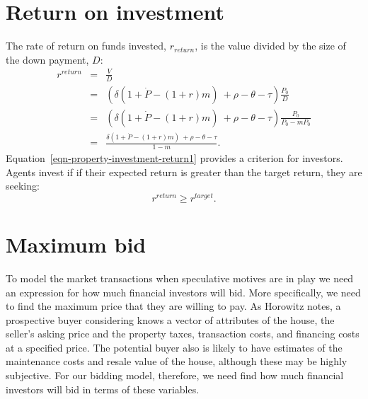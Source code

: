 
\section{Return on investment}

The rate of return on funds invested, $r_{return}$, is the value divided by the size of the down payment, $D$: 
\begin{eqnarray}
r^{return} 
  &=& \frac{V}{D}  \nonumber \\
  &=& \left(\delta \left(1+\dot P - (1+r)m\right) \ + \rho - \theta - \tau \right) \frac{P_0}{D}        \nonumber \\
  &=& \left(\delta \left(1+\dot P - (1+r)m\right) \ + \rho - \theta - \tau \right) \frac{P_0}{P_0-mP_0} \nonumber \\ 
  &=& \frac{\delta \left(1+\dot P - (1+r)m\right) \ + \rho - \theta - \tau }{1-m}.
\label{eqn-property-investment-return1}
\end{eqnarray}
Equation~\ref{eqn-property-investment-return1} provides a criterion for investors. Agents invest if if their expected return is greater than the target return, they are seeking:
\begin{equation}
r^{return} \geq r^{target}. 
\label{eqn-property-investment-return2}
\end{equation}



\section{Maximum bid} %

To model the market transactions when speculative motives are in play we need an expression for  how much financial investors will bid. More specifically, we need to find the maximum price that they are willing to pay. As Horowitz \cite{horowitzBiddingModelsHousing1986} notes, a prospective buyer  considering knows a vector of attributes of the house, the seller’s asking price and the property taxes, transaction costs, and financing costs at a specified price. The  potential buyer also is likely to have estimates of the maintenance costs and resale value of the house, although these may be highly subjective. For our bidding model, therefore, we need find how much financial investors will bid in terms of these variables.



